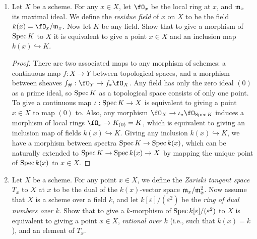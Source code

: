 \documentclass[a4paper]{article}
\begin{document}
\begin{enumerate} [label=\textbf{\arabic*.}, leftmargin=0em]
\item[\textbf{7.}] Let $X$ be a scheme. For any $x \in X$, let $\fO_x$ be the local ring at $x$, and $\mathfrak{m}_x$ its maximal ideal. We define the \textit{residue field} of $x$ on $X$ to be the field $k(x) = \fO_x / \goth{m}_x$. Now let $K$ be any field. Show that to give a morphism of $\operatorname{Spec}{K}$ to $X$ it is equivalent to give a point $x \in X$ and an inclusion map $k(x) \hookrightarrow K$.

\begin{proof}
    There are two associated maps to any morphism of schemes: a continuous map $f: X \to Y$ between topological spaces, and a morphism between sheaves $f_\# : \fO_Y \to f_* \fO_X$. Any field has only the zero ideal $(0)$ as a prime ideal, so $\operatorname{Spec}{K}$ as a topological space consists of only one point. To give a continuous map $\iota : \operatorname{Spec}{K} \to X$ is equivalent to giving a point $x \in X$ to map $(0)$ to. Also, any morphism $\fO_X \to \iota_* \fO_{\spec{K}}$ induces a morphism of local rings $\fO_x \to K_{(0)} = K$, which is equivalent to giving an inclusion map of fields $k(x) \hookrightarrow K$. Giving any inclusion $k(x) \hookrightarrow K$, we have a morphism between spectra $\operatorname{Spec}{K} \to \operatorname{Spec}{k(x)}$, which can be naturally extended to $\operatorname{Spec}{K} \to \operatorname{Spec}{k(x)} \to X$ by mapping the unique point of $\operatorname{Spec}{k(x)}$ to $x \in X$.
\end{proof}

\item[\textbf{8.}] Let $X$ be a scheme. For any point $x \in X$, we define the \textit{Zariski tangent space} $T_x$ to $X$ at $x$ to be the dual of the $k(x)$-vector space $\mathfrak{m}_x / \mathfrak{m}_x^2$. Now assume that $X$ is a scheme over a field $k$, and let $k[\varepsilon] / (\varepsilon^2)$ be the \textit{ring of dual numbers over $k$}. Show that to give a $k$-morphism of $\operatorname{Spec}{k[\varepsilon] / (\varepsilon^2)}$ to $X$ is equivalent to giving a point $x \in X$, \textit{rational over $k$} (i.e., such that $k(x) = k$), and an element of $T_x$.


\end{enumerate}
\end{document}
